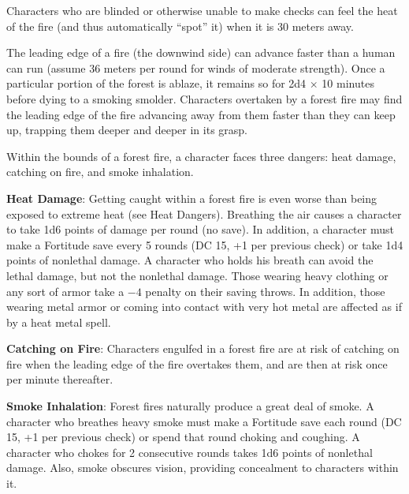 Characters who are blinded or otherwise unable to make  checks can feel the heat of the fire (and thus automatically ``spot'' it) when it is 30 meters away.

The leading edge of a fire (the downwind side) can advance faster than a human can run (assume 36 meters per round for winds of moderate strength). Once a particular portion of the forest is ablaze, it remains so for 2d4 $\times$ 10 minutes before dying to a smoking smolder. Characters overtaken by a forest fire may find the leading edge of the fire advancing away from them faster than they can keep up, trapping them deeper and deeper in its grasp.

Within the bounds of a forest fire, a character faces three dangers: heat damage, catching on fire, and smoke inhalation.

\textbf{Heat Damage}: Getting caught within a forest fire is even worse than being exposed to extreme heat (see Heat Dangers). Breathing the air causes a character to take 1d6 points of damage per round (no save). In addition, a character must make a Fortitude save every 5 rounds (DC 15, +1 per previous check) or take 1d4 points of nonlethal damage. A character who holds his breath can avoid the lethal damage, but not the nonlethal damage. Those wearing heavy clothing or any sort of armor take a $-4$ penalty on their saving throws. In addition, those wearing metal armor or coming into contact with very hot metal are affected as if by a heat metal spell.

\textbf{Catching on Fire}: Characters engulfed in a forest fire are at risk of catching on fire when the leading edge of the fire overtakes them, and are then at risk once per minute thereafter.

\textbf{Smoke Inhalation}: Forest fires naturally produce a great deal of smoke. A character who breathes heavy smoke must make a Fortitude save each round (DC 15, +1 per previous check) or spend that round choking and coughing. A character who chokes for 2 consecutive rounds takes 1d6 points of nonlethal damage. Also, smoke obscures vision, providing concealment to characters within it.